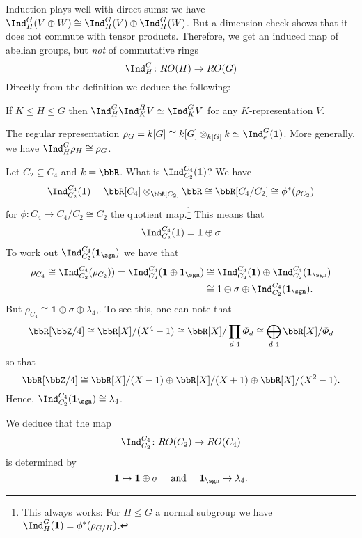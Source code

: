 \documentclass{willowtreebook}
\begin{document}
\begin{remark}
    Induction plays well with direct sums: we have $\Ind_H^G(V \oplus W) \cong \Ind_H^G(V) \oplus \Ind_H^G(W)$. But a dimension check shows that it does not commute with tensor products. Therefore, we get an induced map of abelian groups, but \emph{not} of commutative rings
    \[
\Ind_H^G \colon RO(H) \to RO(G)
    \]
    Directly from the definition we deduce the following:
\end{remark}
\begin{lemma}
If $K \le H \le G$ then $\Ind_H^G\Ind_K^H V \simeq \Ind_K^G V$ for any $K$-representation $V$. 
\end{lemma}
\begin{example}
    The regular representation $\rho_G = k[G] \cong k[G] \otimes_{k[G]} k \simeq \Ind_e^G(\mathbf{1})$. More generally, we have $\Ind_H^G\rho_H \cong \rho_G$. 
\end{example}
\begin{example}
    Let $C_2 \subseteq C_4$ and $k = \bbR$. What is $\Ind_{C_2}^{C_4}(\mathbf{1})$? We have
    \[
\Ind_{C_2}^{C_4}(\mathbf{1}) = \bbR[C_4] \otimes_{\bbR[C_2]}\bbR \cong \bbR[C_4/C_2] \cong \phi^*(\rho_{C_2})
    \]
    for $\phi \colon C_4 \to C_4/C_2 \cong C_2$ the quotient map.\footnote{This always works: For $H \le G$ a normal subgroup we have $\Ind_H^G(\mathbf{1}) = \phi^*(\rho_{G/H})$.} This means that
    \[
\Ind_{C_2}^{C_4}(\mathbf{1}) = \mathbf{1} \oplus \sigma
    \]
    To work out $\Ind_{C_2}^{C_4}(\mathbf{1}_{\sgn})$ we have that
    \[
    \begin{split}
  \rho_{C_4} \cong \Ind_{C_2}^{C_4}(\rho_{C_2})) = \Ind_{C_2}^{C_4}(\mathbf{1} \oplus \mathbf{1}_{\sgn}) &\cong \Ind_{C_2}^{C_4}(\mathbf{1}) \oplus \Ind_{C_2}^{C_4}(\mathbf{1}_{\sgn})\\ &  \cong 1 \oplus \sigma  \oplus \Ind_{C_2}^{C_4}(\mathbf{1}_{\sgn}) .
  \end{split}
    \]
    But $\rho_{C_4} \cong \mathbf{1} \oplus \sigma \oplus \lambda_4$,. To see this, one can note that
    \[
    \bbR[\bbZ/4] \cong \bbR[X]/(X^4-1) \cong \bbR[X]/\prod_{d \mid 4} \Phi_d \cong \bigoplus_{d \mid 4}\bbR[X]/\Phi_d
    \]
    so that
    \[
\bbR[\bbZ/4] \cong \bbR[X]/(X-1) \oplus \bbR[X]/(X+1) \oplus \bbR[X]/(X^2-1). 
    \]
Hence, 
    $\Ind_{C_2}^{C_4}(\mathbf{1}_{\sgn}) \cong \lambda_4$. 
    
    We deduce that the map
    \[
    \Ind_{C_2}^{C_4} \colon RO(C_2) \to RO(C_4)
    \]
    is determined by
    \[
    \mathbf{1} \mapsto \mathbf{1} \oplus \sigma \quad \text{ and } \quad \mathbf{1}_{\sgn} \mapsto \lambda_4.
    \]
    \end{example}
\end{document}
